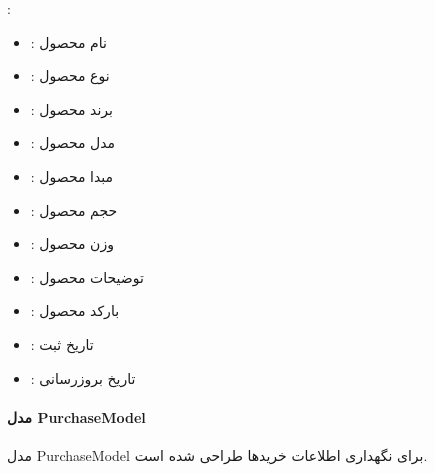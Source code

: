 \documentclass[letterpaper,10pt,english]{sphinxmanual}
\begin{document}
\sphinxAtStartPar
{}:
\begin{itemize}
\item {} 
\sphinxAtStartPar
{}: نام محصول

\item {} 
\sphinxAtStartPar
{}: نوع محصول

\item {} 
\sphinxAtStartPar
{}: برند محصول

\item {} 
\sphinxAtStartPar
{}: مدل محصول

\item {} 
\sphinxAtStartPar
{}: مبدا محصول

\item {} 
\sphinxAtStartPar
{}: حجم محصول

\item {} 
\sphinxAtStartPar
{}: وزن محصول

\item {} 
\sphinxAtStartPar
{}: توضیحات محصول

\item {} 
\sphinxAtStartPar
{}: بارکد محصول

\item {} 
\sphinxAtStartPar
{}: تاریخ ثبت

\item {} 
\sphinxAtStartPar
{}: تاریخ بروزرسانی

\end{itemize}


\paragraph{مدل PurchaseModel}
\label{\detokenize{modules/core:purchasemodel}}
\sphinxAtStartPar
مدل PurchaseModel برای نگهداری اطلاعات خریدها طراحی شده است.
\end{document}
